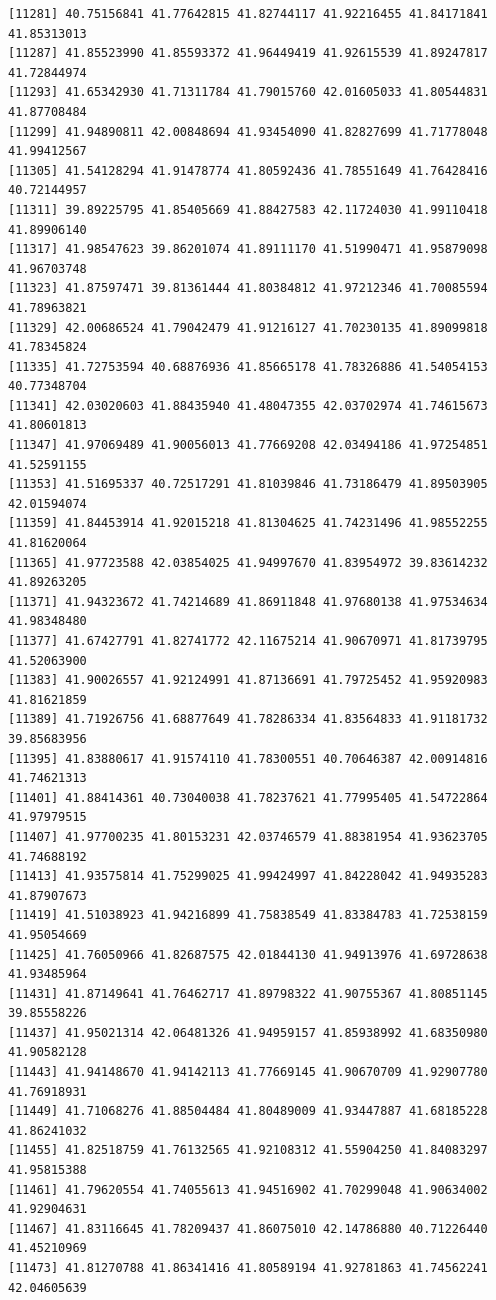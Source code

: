 \documentclass[
  letterpaper,
  DIV=11,
  numbers=noendperiod]{scrartcl}
\begin{document}
\begin{verbatim}
[11281] 40.75156841 41.77642815 41.82744117 41.92216455 41.84171841 41.85313013
[11287] 41.85523990 41.85593372 41.96449419 41.92615539 41.89247817 41.72844974
[11293] 41.65342930 41.71311784 41.79015760 42.01605033 41.80544831 41.87708484
[11299] 41.94890811 42.00848694 41.93454090 41.82827699 41.71778048 41.99412567
[11305] 41.54128294 41.91478774 41.80592436 41.78551649 41.76428416 40.72144957
[11311] 39.89225795 41.85405669 41.88427583 42.11724030 41.99110418 41.89906140
[11317] 41.98547623 39.86201074 41.89111170 41.51990471 41.95879098 41.96703748
[11323] 41.87597471 39.81361444 41.80384812 41.97212346 41.70085594 41.78963821
[11329] 42.00686524 41.79042479 41.91216127 41.70230135 41.89099818 41.78345824
[11335] 41.72753594 40.68876936 41.85665178 41.78326886 41.54054153 40.77348704
[11341] 42.03020603 41.88435940 41.48047355 42.03702974 41.74615673 41.80601813
[11347] 41.97069489 41.90056013 41.77669208 42.03494186 41.97254851 41.52591155
[11353] 41.51695337 40.72517291 41.81039846 41.73186479 41.89503905 42.01594074
[11359] 41.84453914 41.92015218 41.81304625 41.74231496 41.98552255 41.81620064
[11365] 41.97723588 42.03854025 41.94997670 41.83954972 39.83614232 41.89263205
[11371] 41.94323672 41.74214689 41.86911848 41.97680138 41.97534634 41.98348480
[11377] 41.67427791 41.82741772 42.11675214 41.90670971 41.81739795 41.52063900
[11383] 41.90026557 41.92124991 41.87136691 41.79725452 41.95920983 41.81621859
[11389] 41.71926756 41.68877649 41.78286334 41.83564833 41.91181732 39.85683956
[11395] 41.83880617 41.91574110 41.78300551 40.70646387 42.00914816 41.74621313
[11401] 41.88414361 40.73040038 41.78237621 41.77995405 41.54722864 41.97979515
[11407] 41.97700235 41.80153231 42.03746579 41.88381954 41.93623705 41.74688192
[11413] 41.93575814 41.75299025 41.99424997 41.84228042 41.94935283 41.87907673
[11419] 41.51038923 41.94216899 41.75838549 41.83384783 41.72538159 41.95054669
[11425] 41.76050966 41.82687575 42.01844130 41.94913976 41.69728638 41.93485964
[11431] 41.87149641 41.76462717 41.89798322 41.90755367 41.80851145 39.85558226
[11437] 41.95021314 42.06481326 41.94959157 41.85938992 41.68350980 41.90582128
[11443] 41.94148670 41.94142113 41.77669145 41.90670709 41.92907780 41.76918931
[11449] 41.71068276 41.88504484 41.80489009 41.93447887 41.68185228 41.86241032
[11455] 41.82518759 41.76132565 41.92108312 41.55904250 41.84083297 41.95815388
[11461] 41.79620554 41.74055613 41.94516902 41.70299048 41.90634002 41.92904631
[11467] 41.83116645 41.78209437 41.86075010 42.14786880 40.71226440 41.45210969
[11473] 41.81270788 41.86341416 41.80589194 41.92781863 41.74562241 42.04605639

\end{verbatim}
\end{document}
